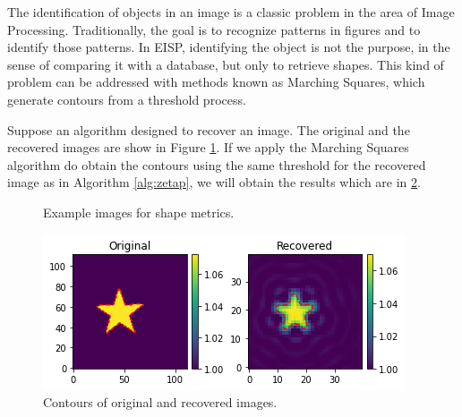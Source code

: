 		The identification of objects in an image is a classic problem in the area of Image Processing. Traditionally, the goal is to recognize patterns in figures and to identify those patterns. In EISP, identifying the object is not the purpose, in the sense of comparing it with a database, but only to retrieve shapes. This kind of problem can be addressed with methods known as Marching Squares, which generate contours from a threshold process.
		
		Suppose an algorithm designed to recover an image. The original and the recovered images are show in Figure \ref{fig:annex:zetas:example}. If we apply the Marching Squares algorithm do obtain the contours using the same threshold for the recovered image as in Algorithm \ref{alg:zetap}, we will obtain the results which are in \ref{fig:annex:zetas:contours}.
		\begin{figure}[!htb]
			\centering
			\caption{Example images for shape metrics.}
			\label{fig:annex:zetas:example}
		\end{figure}
		\begin{figure}[!htb]
			\centering
			\includegraphics[width=.7\textwidth]{./figuras/annex/02_zetas/output_8_1.png}
			\caption{Contours of original and recovered images.}
			\label{fig:annex:zetas:contours}
		\end{figure}
		
